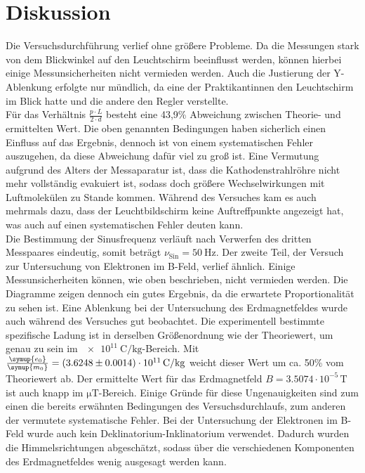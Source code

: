 \section{Diskussion}
\label{sec:Diskussion}

Die Versuchsdurchführung verlief ohne größere Probleme.
Da die Messungen stark von dem Blickwinkel auf den Leuchtschirm beeinflusst werden, können hierbei einige Messunsicherheiten nicht vermieden werden.
Auch die Justierung der Y-Ablenkung erfolgte nur mündlich, da eine der Praktikantinnen den Leuchtschirm im Blick hatte und die andere den Regler verstellte.
\\
\noindent
Für das Verhältnis $\frac{p \cdot L}{2\cdot d}$ besteht eine 43,9\% Abweichung zwischen Theorie- und ermittelten Wert.
Die oben genannten Bedingungen haben sicherlich einen Einfluss auf das Ergebnis, dennoch ist von einem systematischen Fehler auszugehen, da diese Abweichung dafür viel zu groß ist.
Eine Vermutung aufgrund des Alters der Messaparatur ist, dass die Kathodenstrahlröhre nicht mehr vollständig evakuiert ist, sodass doch größere Wechselwirkungen mit Luftmolekülen zu Stande kommen.
Während des Versuches kam es auch mehrmals dazu, dass der Leuchtbildschirm keine Auftreffpunkte angezeigt hat, was auch auf einen systematischen Fehler deuten kann.
\\
\noindent
Die Bestimmung der Sinusfrequenz verläuft nach Verwerfen des dritten Messpaares eindeutig, somit beträgt $\nu_\text{Sin} = \SI{50}{\hertz}$.
\noindent
Der zweite Teil, der Versuch zur Untersuchung von Elektronen im B-Feld, verlief ähnlich.
Einige Messunsicherheiten können, wie oben beschrieben, nicht vermieden werden.
Die Diagramme zeigen dennoch ein gutes Ergebnis, da die erwartete Proportionalität zu sehen ist.
Eine Ablenkung bei der Untersuchung des Erdmagnetfeldes wurde auch während des Versuches gut beobachtet.
Die experimentell bestimmte spezifische Ladung ist in derselben Größenordnung wie der Theoriewert, um genau zu sein im $\SI{e11}{\coulomb\per\kilo\gram}$-Bereich.
Mit $\frac{\symup{e_0}}{\symup{m_0}} = (3.6248\pm 0.0014) \cdot 10^{11} \, \si{\coulomb\per\kilo\gram}$ weicht dieser Wert um ca. 50\% vom Theoriewert ab.
Der ermittelte Wert für das Erdmagnetfeld $B = 3.5074 \cdot 10^{-5} \, \si{\tesla}$ ist auch knapp im $\si{\micro\tesla}$-Bereich.
Einige Gründe für diese Ungenauigkeiten sind zum einen die bereits erwähnten Bedingungen des Versuchsdurchlaufs, zum anderen der vermutete systematische Fehler.
Bei der Untersuchung der Elektronen im B-Feld wurde auch kein Deklinatorium-Inklinatorium verwendet.
Dadurch wurden die Himmelsrichtungen abgeschätzt, sodass über die verschiedenen Komponenten des Erdmagnetfeldes wenig ausgesagt werden kann.